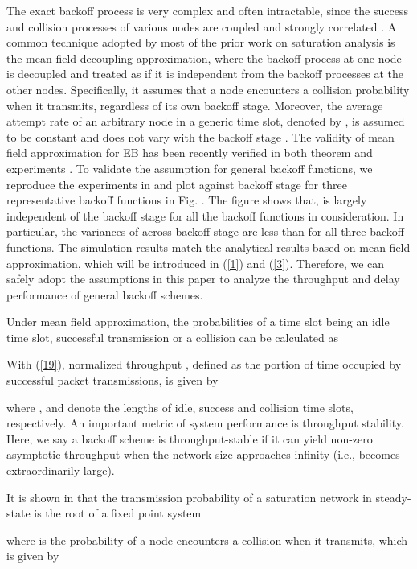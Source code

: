 \documentclass[journal]{IEEEtran}
\begin{document}
The exact backoff process is very complex and often intractable, since the success and collision processes of various nodes are coupled and strongly correlated \cite{2008:Benaim}. A common technique adopted by most of the prior work on saturation analysis is the mean field decoupling approximation, where the backoff process at one node is decoupled and treated as if it is independent from the backoff processes at the other nodes. Specifically, it assumes that a node encounters a collision probability  when it transmits, regardless of its own backoff stage. Moreover, the average attempt rate of an arbitrary node in a generic time slot, denoted by , is assumed to be constant and does not vary with the backoff stage \cite{2000:Bianchi}. The validity of mean field approximation for EB has been recently verified in both theorem and experiments \cite{2009:Cho,2010:Huang}. To validate the assumption for general backoff functions, we reproduce the experiments in \cite{2010:Huang} and plot  against backoff stage for three representative backoff functions in Fig. . The figure shows that,  is largely independent of the backoff stage for all the backoff functions in consideration. In particular, the variances of  across backoff stage are less than  for all three backoff functions. The simulation results match the analytical results based on mean field approximation, which will be introduced in (\ref{1}) and (\ref{3}). Therefore, we can safely adopt the assumptions in this paper to analyze the throughput and delay performance of general backoff schemes.

Under mean field approximation, the probabilities of a time slot being an idle time slot, successful transmission or a collision can be calculated as

With (\ref{19}), normalized throughput , defined as the portion of time occupied by successful packet transmissions, is given by

where ,  and  denote the lengths of idle, success and collision time slots, respectively. An important metric of system performance is throughput stability. Here, we say a backoff scheme is throughput-stable if it can yield non-zero asymptotic throughput when the network size approaches infinity (i.e., becomes extraordinarily large).

It is shown in \cite{2005:Bianchi} that the transmission probability  of a saturation network in steady-state is the root of a fixed point system

where  is the probability of a node encounters a collision when it transmits, which is given by
\end{document}
